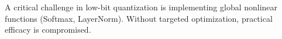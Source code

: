 \begin{revcomment}
A critical challenge in low-bit quantization is implementing global nonlinear functions (Softmax, LayerNorm). Without targeted optimization, practical efficacy is compromised. 

\end{revcomment}
